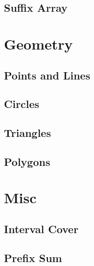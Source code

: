 \documentclass[a4paper,landscape,8pt]{article}
\begin{document}
\begin{multicols}{2}
\subsection{Suffix Array}



\section{Geometry}

\subsection{Points and Lines}


\subsection{Circles}


\subsection{Triangles}


\subsection{Polygons}



\section{Misc}

\subsection{Interval Cover}


\subsection{Prefix Sum}



\end{multicols}
\end{document}
